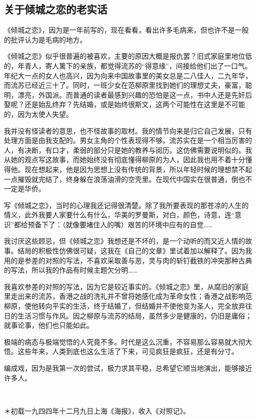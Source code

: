 \subsection{关于倾城之恋的老实话}

\par 《倾城之恋》，因为是一年前写的，现在看看，看出许多毛病来，但也许不是一般的批评认为是毛病的地方。
\par 《倾城之恋》似乎很普遍的被喜欢，主要的原因大概是报仇罢？旧式家庭里地位低的，年青人，寄人篱下的亲族，都觉得流苏的“得意缘”，间接给他们出了一口气。年纪大一点的女人也高兴，因为向来中国故事里的美女总是二八佳人，二九年华，而流苏已经近三十了。同时，一班少女在范柳原里找到她们的理想丈夫，豪富，聪明，漂亮，外国派。而普通的读者最感到兴趣的恐怕是这一点，书中人还是先奸后娶呢？还是始乱终弃？先结婚，或是始终很斯文，这两个可能性在这里是不可能的，因为太使人失望。
\par 我并没有怪读者的意思，也不怪故事的取材。我的情节向来是归它自己发展，只有处理方面是由我支配的。男女主角的个性表现得不够。流苏实在是一个相当厉害的人，有决断，有口才，柔弱的部分只是她的教养与阅历。这仿佛需要说明似的。我从她的观点写这故事，而她始终没有彻底懂得柳原的为人，因此我也用不着十分懂得他。现在想起来，他是因为思想上没有传统的背景，所以年轻时候的理想禁不起一点摧毁就完结了，终身躲在浪荡油滑的空壳里。在现代中国实在很普通，倒也不一定是华侨。
\par 写《倾城之恋》，当时的心理我还记得很清楚。除了我所要表现的那苍凉的人生的情义，此外我要人家要什么有什么，华美的罗曼斯，对白，颜色，诗意，连“意识”都给预备下了：（就像要堵住人的嘴）艰苦的环境中应有的自觉……
\par 我讨厌这些顾忌，但《倾城之恋》我想还是不坏的，是一个动听的而又近人情的故事。结局的积极性仿佛很可疑，这我在《自己的文章》里试着加以解释了。因为我用的是参差的对照的写法，不喜欢采取善与恶，灵与肉的斩钉截铁的冲突那种古典的写法，所以我的作品有时候主题欠分明……
\par 我喜欢参差的对照的写法，因为它是较近事实的。《倾城之恋》里，从腐旧的家庭里走出来的流苏，香港之战的洗礼并不曾将她感化成为革命女性；香港之战影响范柳原，使他转向平实的生活，终于结婚了，但结婚并不使他变为圣人，完全放弃往日的生活习惯与作风。因之柳原与流苏的结局，虽然多少是健康的，仍旧是庸俗；就事论事，他们也只能如此。
\par 极端的病态与极端觉悟的人究竟不多。时代是这么沉重，不容易那么容易就大彻大悟。这些年来，人类到底也这么生活了下来，可见疯狂是疯狂，还是有分寸。
\par 编成戏，因为是我第一次的尝试，极力求其平稳，总希望它顺当地演出，能够接近许多人。
\par  
\par ＊初载一九四四年十二月九日上海《海报》，收入《对照记》。


